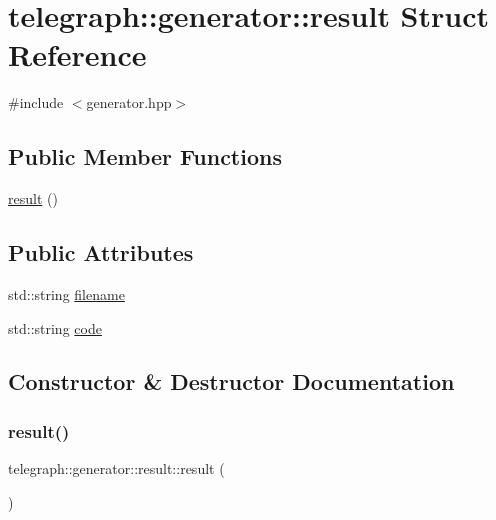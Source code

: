 \hypertarget{structtelegraph_1_1generator_1_1result}{}\section{telegraph\+:\+:generator\+:\+:result Struct Reference}
\label{structtelegraph_1_1generator_1_1result}


{\ttfamily \#include $<$generator.\+hpp$>$}

\subsection*{Public Member Functions}
\begin{DoxyCompactItemize}
\item 
\hyperlink{structtelegraph_1_1generator_1_1result_ada8a0a692c8400c494dee7c3bf887089}{result} ()
\end{DoxyCompactItemize}
\subsection*{Public Attributes}
\begin{DoxyCompactItemize}
\item 
std\+::string \hyperlink{structtelegraph_1_1generator_1_1result_a1c61e7b62edde7e2189aee9f1007b2f5}{filename}
\item 
std\+::string \hyperlink{structtelegraph_1_1generator_1_1result_a2ad8db06b54ff998dcd2b407c855eb6e}{code}
\end{DoxyCompactItemize}


\subsection{Constructor \& Destructor Documentation}
\mbox{\label{structtelegraph_1_1generator_1_1result_ada8a0a692c8400c494dee7c3bf887089}} 
\subsubsection{\texorpdfstring{result()}{result()}}
{\footnotesize\ttfamily telegraph\+::generator\+::result\+::result (\begin{DoxyParamCaption}{ }\end{DoxyParamCaption})\hspace{0.3cm}{\ttfamily [inline]}}




